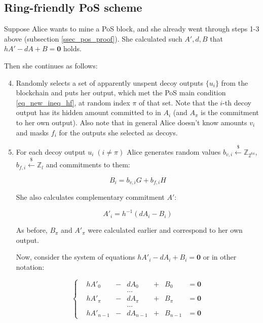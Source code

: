 \documentclass{article}
\numberwithin{figure}{section}
\begin{document}
\subsection{Ring-friendly PoS scheme}

Suppose Alice wants to mine a PoS block, and she already went through steps 1-3 above (subsection \ref{ssec_pos_proof}). She calculated such $A', d, B$ that $ hA' - dA + B = \mathbf{0} $ holds.

Then she continues as follows:
\begin{enumerate}
    \setcounter{enumi}{3} 
    \item Randomly selects a set of apparently unspent decoy outputs $\{u_i\}$ from the blockchain and puts her output, which met the PoS main condition \eqref{eq_new_ineq_hf}, at random index $\pi$ of that set. Note that the $i$-th decoy output has its hidden amount committed to in $A_i$ (and $A_\pi$ is the commitment to her own output). Also note that in general Alice doesn't know amounts $v_i$ and masks $f_i$ for the outputs she selected as decoys.
    
    \item For each decoy output $u_i \; (i \neq \pi)$ Alice generates random values $b_{v,i} \stackrel{\$}{\leftarrow} \mathbb{Z}_{2^{64}}$, $b_{f,i} \stackrel{\$}{\leftarrow} \mathbb{Z}_l$ and commitments to them: 
    
    \begin{equation} \label{rfpos_Bi}
        B_i = b_{v,i} G + b_{f,i} H
    \end{equation} 
    
    She also calculates complementary commitment $A'$:
    
    \begin{equation} \label{rfpos_Aprimei}
        A'_i = h^{-1}(dA_i - B_i)
    \end{equation}
    
    As before, $B_\pi$ and $A'_\pi$ were calculated earlier and correspond to her own output.
    
    Now, consider the system of equations $hA'_i - dA_i + B_i = \mathbf{0}$ or in other notation:
    
    \begin{equation} \label{rfpos_sys}
    \left\{ \begin{aligned} 
        &h A'_0 &- &d A_0 &+ &B_0 &= \mathbf{0} \\
        &&& \dots &&& \\
        &h A'_\pi &- &d A_\pi &+  &B_\pi &= \mathbf{0} \\
        &&& \dots &&& \\
        &h A'_{n-1} &- &d A_{n-1} &+ &B_{n-1} &= \mathbf{0}
    \end{aligned} \right.
    \end{equation}
    

\end{enumerate}
\end{document}
